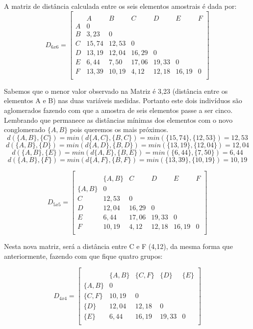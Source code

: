 \documentclass[
]{book}
\begin{document}
A matriz de distância calculada entre os seis elementos amostrais é dada por:
\[D_{6x6}=\begin{bmatrix}\\
 &A&B&C&D&E&F \\
 A&0&&&&&\\
 B&3,23&0&&&&\\
 C & 15,74& 12,53&0&&&\\
 D& 13,19& 12,04& 16,29&0&&\\
 E& 6,44& 7,50& 17,06& 19,33&0&\\
 F& 13,39& 10,19& 4,12& 12,18& 16,19&0 \\
\end{bmatrix}\]

Sabemos que o menor valor observado na Matriz é 3,23 (distância entre os elementos A e B) nas duas variáveis medidas. Portanto este dois indivíduos são aglomerados fazendo com que a amostra de seis elementos passe a ser cinco. Lembrando que permanece as distâncias mínimas dos elementos com o novo conglomerado \(\{A,B\}\) pois queremos os mais próximos.
\[d(\{A,B\},\{C\})=min(d\{A,C\},\{B,C\})=min(\{15,74\},\{12,53\})=12,53\]
\[d(\{A,B\},\{D\})=min(d\{A,D\},\{B,D\})=min(\{13,19\},\{12,04\})=12,04\]
\[d(\{A,B\},\{E\})=min(d\{A,E\},\{B,E\})=min(\{6,44\},\{7,50\})=6,44\]
\[d(\{A,B\},\{F\})=min(d\{A,F\},\{B,F\})=min(\{13,39\},\{10,19\})=10,19\]

\[D_{5x5}=\begin{bmatrix}\\
 &\{A,B\}&C&D&E&F \\
 \{A,B\}&0&&&&\\
 C & 12,53&0&&&\\
 D& 12,04& 16,29&0&&\\
 E& 6,44& 17,06& 19,33&0&\\
 F& 10,19& 4,12& 12,18& 16,19&0 \\
\end{bmatrix}\]

Nesta nova matriz, será a distância entre C e F (4,12), da mesma forma que anteriormente, fazendo com que fique quatro grupos:

\[D_{4x4}=\begin{bmatrix}\\
 &\{A,B\}& \{C,F\}&\{D\}&\{E\} \\
 \{A,B\}&0&&\\
 \{C,F\} & 10,19&0&&\\
 \{D\}& 12,04& 12,18&0&\\
 \{E\}& 6,44& 16,19& 19,33&0\\
\end{bmatrix}\]
\end{document}
